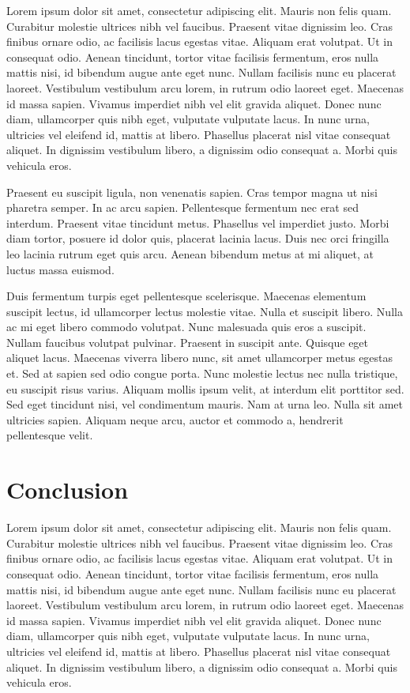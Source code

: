 \documentclass[english]{tktltiki}
\begin{document}
Lorem ipsum dolor sit amet, consectetur adipiscing elit. Mauris non felis quam. Curabitur molestie ultrices nibh vel faucibus. Praesent vitae dignissim leo. Cras finibus ornare odio, ac facilisis lacus egestas vitae. Aliquam erat volutpat. Ut in consequat odio. Aenean tincidunt, tortor vitae facilisis fermentum, eros nulla mattis nisi, id bibendum augue ante eget nunc. Nullam facilisis nunc eu placerat laoreet. Vestibulum vestibulum arcu lorem, in rutrum odio laoreet eget. Maecenas id massa sapien. Vivamus imperdiet nibh vel elit gravida aliquet. Donec nunc diam, ullamcorper quis nibh eget, vulputate vulputate lacus. In nunc urna, ultricies vel eleifend id, mattis at libero. Phasellus placerat nisl vitae consequat aliquet. In dignissim vestibulum libero, a dignissim odio consequat a. Morbi quis vehicula eros.

Praesent eu suscipit ligula, non venenatis sapien. Cras tempor magna ut nisi pharetra semper. In ac arcu sapien. Pellentesque fermentum nec erat sed interdum. Praesent vitae tincidunt metus. Phasellus vel imperdiet justo. Morbi diam tortor, posuere id dolor quis, placerat lacinia lacus. Duis nec orci fringilla leo lacinia rutrum eget quis arcu. Aenean bibendum metus at mi aliquet, at luctus massa euismod.

Duis fermentum turpis eget pellentesque scelerisque. Maecenas elementum suscipit lectus, id ullamcorper lectus molestie vitae. Nulla et suscipit libero. Nulla ac mi eget libero commodo volutpat. Nunc malesuada quis eros a suscipit. Nullam faucibus volutpat pulvinar. Praesent in suscipit ante. Quisque eget aliquet lacus. Maecenas viverra libero nunc, sit amet ullamcorper metus egestas et. Sed at sapien sed odio congue porta. Nunc molestie lectus nec nulla tristique, eu suscipit risus varius. Aliquam mollis ipsum velit, at interdum elit porttitor sed. Sed eget tincidunt nisi, vel condimentum mauris. Nam at urna leo. Nulla sit amet ultricies sapien. Aliquam neque arcu, auctor et commodo a, hendrerit pellentesque velit.

\pagebreak

\section{Conclusion}


Lorem ipsum dolor sit amet, consectetur adipiscing elit. Mauris non felis quam. Curabitur molestie ultrices nibh vel faucibus. Praesent vitae dignissim leo. Cras finibus ornare odio, ac facilisis lacus egestas vitae. Aliquam erat volutpat. Ut in consequat odio. Aenean tincidunt, tortor vitae facilisis fermentum, eros nulla mattis nisi, id bibendum augue ante eget nunc. Nullam facilisis nunc eu placerat laoreet. Vestibulum vestibulum arcu lorem, in rutrum odio laoreet eget. Maecenas id massa sapien. Vivamus imperdiet nibh vel elit gravida aliquet. Donec nunc diam, ullamcorper quis nibh eget, vulputate vulputate lacus. In nunc urna, ultricies vel eleifend id, mattis at libero. Phasellus placerat nisl vitae consequat aliquet. In dignissim vestibulum libero, a dignissim odio consequat a. Morbi quis vehicula eros.
\end{document}
